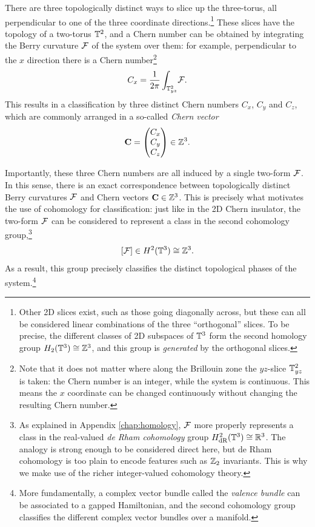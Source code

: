There are three topologically distinct ways to slice up the three-torus, all perpendicular to one of the three coordinate directions.\footnote{
	Other 2D slices exist, such as those going diagonally across, but these can all be considered linear combinations of the three ``orthogonal'' slices. To be precise, the different classes of 2D subspaces of $\mathbb{T}^3$ form the second homology group $H_2(\mathbb{T}^3)\cong\mathbb{Z}^3$, and this group is \emph{generated} by the orthogonal slices.}
These slices have the topology of a two-torus $\mathbb{T}^2$, and a Chern number can be obtained by integrating the Berry curvature $\mathcal{F}$ of the system over them: for example, perpendicular to the $x$ direction there is a Chern number\footnote{
	Note that it does not matter where along the Brillouin zone the $yz$-slice $\mathbb{T}_{yz}^2$ is taken: the Chern number is an integer, while the system is continuous. This means the $x$ coordinate can be changed continuously without changing the resulting Chern number.}
\begin{equation*}
	C_{x} = \frac{1}{2\pi}\int_{\mathbb{T}_{yz}^2}\!\mathcal{F}.
\end{equation*}
This results in a classification by three distinct Chern numbers $C_x$, $C_y$ and $C_z$, which are commonly arranged in a so-called \emph{Chern vector}
\[
	\vb{C} = \begin{pmatrix}
		C_x \\ C_y \\ C_z
	\end{pmatrix} \in \mathbb{Z}^3.
\]

Importantly, these three Chern numbers are all induced by a single two-form $\mathcal{F}$. In this sense, there is an exact correspondence between topologically distinct Berry curvatures $\mathcal{F}$ and Chern vectors $\vb{C}\in\mathbb{Z}^3$. This is precisely what motivates the use of cohomology for classification: just like in the 2D Chern insulator, the two-form $\mathcal{F}$ can be considered to represent a class in the second cohomology group,\footnote{
	As explained in Appendix \ref{chap:homology}, $\mathcal{F}$ more properly represents a class in the real-valued \emph{de Rham cohomology} group $H_{\rm dR}^2(\mathbb{T}^3)\cong\mathbb{R}^3$. The analogy is strong enough to be considered direct here, but de Rham cohomology is too plain to encode features such as $\mathbb{Z}_2$ invariants. This is why we make use of the richer integer-valued cohomology theory.} %
\begin{equation}\label{eq:2nd-cohom-t3}
	[\mathcal{F}]\in H^2(\mathbb{T}^3)\cong\mathbb{Z}^3. 
\end{equation}
As a result, this group precisely classifies the distinct topological phases of the system.\footnote{
	More fundamentally, a complex vector bundle called the \emph{valence bundle} can be associated to a gapped Hamiltonian, and the second cohomology group classifies the different complex vector bundles over a manifold.} %


